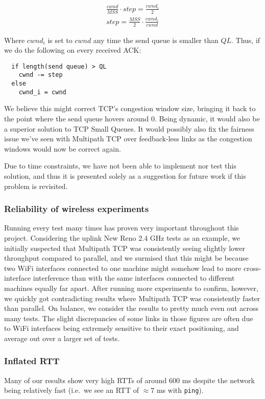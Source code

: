 \begin{align*}
  \frac{cwnd}{MSS} \cdot step = \frac{cwnd_i}{2} \\
  step = \frac{MSS}{2} \cdot \frac{cwnd_i}{cwnd}
\end{align*}

Where $cwnd_i$ is set to $cwnd$ any time the send queue is smaller than $QL$.
Thus, if we do the following on every received ACK:

\begin{verbatim}
  if length(send queue) > QL
    cwnd -= step
  else
    cwnd_i = cwnd
\end{verbatim}

We believe this might correct TCP's congestion window size, bringing it back to
the point where the send queue hovers around 0. Being dynamic, it would also be
a superior solution to TCP Small Queues. It would possibly also fix the fairness
issue we've seen with Multipath TCP over feedback-less links as the congestion
windows would now be correct again.

Due to time constraints, we have not been able to implement nor test this
solution, and thus it is presented solely as a suggestion for future work
if this problem is revisited.

\subsubsection{Reliability of wireless experiments}
Running every test many times has proven very important throughout this project.
Considering the uplink New Reno 2.4 GHz tests as an example, we initially 
suspected that Multipath TCP was consistently seeing slightly lower 
throughput compared to parallel, and we surmised that this might be because two 
WiFi interfaces connected to one machine might somehow lead to more 
cross-interface interference than with the same interfaces connected to 
different machines equally far apart. After running more experiments to confirm, 
however, we quickly got contradicting results where Multipath TCP was 
consistently faster than parallel. On balance, we consider the results to pretty 
much even out across many tests. The slight discrepancies of some links in those 
figures are often due to WiFi interfaces being extremely sensitive to their 
exact positioning, and average out over a larger set of tests.

\subsubsection{Inflated RTT}
Many of our results show very high RTTs of around 600 ms despite the network
being relatively fast (i.e.\ we see an RTT of $\approx 7$ ms with
\texttt{ping}). 

